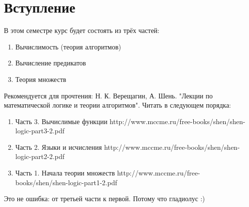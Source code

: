 \section{Вступление}
В этом семестре курс будет состоять из трёх частей:
\begin{enumerate}
	\item Вычислимость (теория алгоритмов)
	\item Вычисление предикатов
	\item Теория множеств
\end{enumerate}
Рекомендуется для прочтения: Н. К. Верещагин, А. Шень. "Лекции по математической логике и теории алгоритмов".
Читать в следующем порядка:
\begin{enumerate}
	\item Часть 3. Вычислимые функции 
	http://www.mccme.ru/free-books/shen/shen-logic-part3-2.pdf
	\item Часть 2. Языки и исчисления
	http://www.mccme.ru/free-books/shen/shen-logic-part2-2.pdf
	\item Часть 1. Начала теории множеств
	http://www.mccme.ru/free-books/shen/shen-logic-part1-2.pdf
\end{enumerate}
Это не ошибка: от третьей части к первой.
Потому что гладиолус :)
